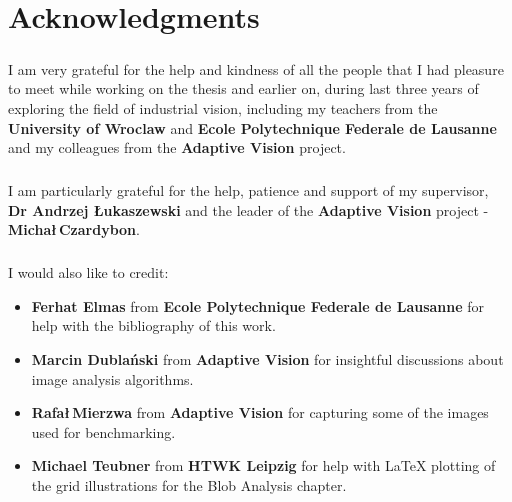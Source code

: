 ﻿\chapter{Acknowledgments} 

\paragraph*{}
I am very grateful for the help and kindness of all the people that I had pleasure to meet while working on the thesis and earlier on, during last three years of exploring the field of industrial vision, including my teachers from the \textbf{University of Wroclaw} and \textbf{Ecole Polytechnique Federale de Lausanne} and my colleagues from the \textbf{Adaptive Vision} project.

\paragraph*{}
I am particularly grateful for the help, patience and support of my supervisor, \textbf{Dr Andrzej \L ukaszewski} and the leader of the \textbf{Adaptive Vision} project - \textbf{Micha\l \,Czardybon}. 

\paragraph*{}
I would also like to credit:
\begin{itemize}
	\item \textbf{Ferhat Elmas} from \textbf{Ecole Polytechnique Federale de Lausanne} for help with the bibliography of this work.
	\item \textbf{Marcin Dubla\'nski} from \textbf{Adaptive Vision} for insightful discussions about image analysis algorithms.
	\item \textbf{Rafa\l  \,Mierzwa} from \textbf{Adaptive Vision} for capturing some of the images used for benchmarking.
	\item \textbf{Michael Teubner} from \textbf{HTWK Leipzig} for help with LaTeX plotting of the grid illustrations for the Blob Analysis chapter.
\end{itemize} 
\pagebreak 